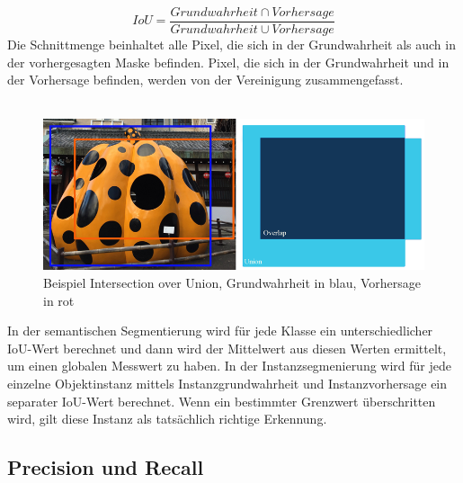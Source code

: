 \begin{equation}\label{equation:recall}
  IoU = \frac{Grundwahrheit\cap Vorhersage}{Grundwahrheit\cup Vorhersage}
\end{equation}
\noindent
Die Schnittmenge beinhaltet alle Pixel, die sich in der Grundwahrheit als auch in der vorhergesagten Maske befinden. Pixel, die sich in der Grundwahrheit und in der Vorhersage befinden, werden von der Vereinigung zusammengefasst. 
\\\\
\begin{figure}[ht]
  \centering
  \includegraphics[width=\textwidth]{pics/iou.PNG}
  \caption[IoU]{Beispiel Intersection over Union, Grundwahrheit in blau, Vorhersage in rot\cite{ref:map}}
  \label{fig:iou}
\end{figure}
\noindent
In der semantischen Segmentierung wird für jede Klasse ein unterschiedlicher IoU-Wert berechnet und dann wird der Mittelwert aus diesen Werten ermittelt, um einen globalen Messwert zu haben. In der Instanzsegmenierung wird für jede einzelne Objektinstanz mittels Instanzgrundwahrheit und Instanzvorhersage ein separater IoU-Wert berechnet. Wenn ein bestimmter Grenzwert überschritten wird, gilt diese Instanz als tatsächlich richtige Erkennung.\cite{ref:jordan}

\subsection{Precision und Recall}

